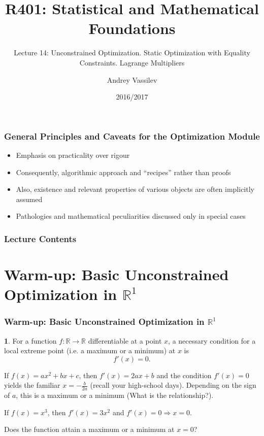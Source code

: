 \documentclass[10pt]{beamer}
\title{R401: Statistical and Mathematical Foundations}
\subtitle{Lecture 14: Unconstrained Optimization. Static Optimization with Equality Constraints. Lagrange Multipliers}
\author{Andrey Vassilev}
\date{2016/2017}
\theoremstyle{definition}
\newtheorem{Fact}{\translate{Fact}}
\begin{document}
\maketitle

\begin{frame}[fragile]
\frametitle{General Principles and Caveats for the Optimization Module}
\begin{itemize}
\item Emphasis on practicality over rigour
\item Consequently, algorithmic approach and ``recipes'' rather than proofs
\item Also, existence and relevant properties of various objects are often implicitly assumed
\item Pathologies and mathematical peculiarities discussed only in special cases
\end{itemize}
\end{frame}

\begin{frame}[fragile]
\frametitle{Lecture Contents}
\tableofcontents
\end{frame}

\section{Warm-up: Basic Unconstrained Optimization in $ \mathbb{R}^1 $}\label{sec:R1}

\begin{frame}[fragile]
\frametitle{Warm-up: Basic Unconstrained Optimization in $ \mathbb{R}^1 $}

\begin{Fact}
For a function $ f: \mathbb{R} \rightarrow \mathbb{R} $ differentiable at a point $ x $, a necessary condition for a local extreme point (i.e. a maximum or a minimum) at $ x $ is \[ f'(x) = 0. \]
\end{Fact}
\bigskip

\begin{example} %
If $ f(x) = ax^2 + bx + c $, then $ f'(x) = 2ax + b $ and the condition $ f'(x)=0 $ yields the familiar $ x=-\frac{b}{2a} $ (recall your high-school days). Depending on the sign of $ a $, this is a maximum or a minimum (What is the relationship?).
\end{example}\bigskip

\begin{example} %
If $ f(x) = x^3 $, then $ f'(x)=3x^2 $ and $ f'(x)=0 \Rightarrow x=0$.

Does the function attain a maximum or a minimum at $ x=0 $?
\end{example}
\end{frame}
\end{document}
